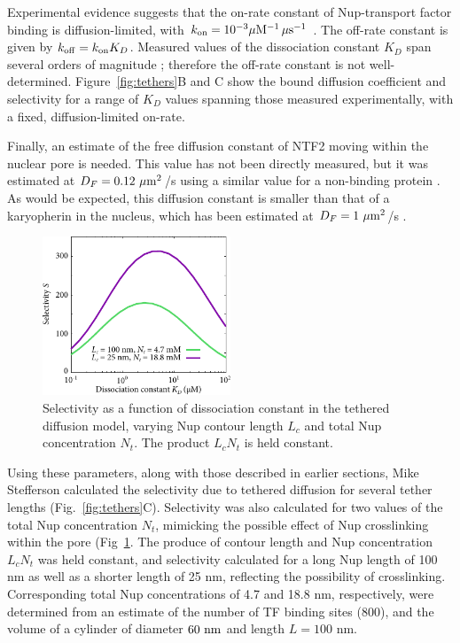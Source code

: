 Experimental evidence suggests that the on-rate constant of Nup-transport factor binding is diffusion-limited, with $k_{\rm on} = 10^{-3}\mu \mathrm{M}^{-1} \, \mu \mathrm{s}^{-1}$ \cite{milles15, hough15}.  The off-rate constant is given by $k_{\rm off} = k_{\rm on} K_D$.  Measured values of the dissociation constant $K_D$ span several orders of magnitude \cite{things}; therefore the off-rate constant is not well-determined.  Figure~\ref{fig:tethers}B and C show the bound diffusion coefficient and selectivity for a range of $K_D$ values spanning those measured experimentally, with a fixed, diffusion-limited on-rate.

Finally, an estimate of the free diffusion constant of NTF2 moving within the nuclear pore is needed.  This value has not been directly measured, but it was estimated at $D_F = 0.12 \ \mu\mathrm{m}^2$/s using a similar value for a non-binding protein \cite{ribbeck01}.  As would be expected, this diffusion constant is smaller than that of a karyopherin in the nucleus, which has been estimated at $D_F =1 \ \mu\mathrm{m}^2$/s \cite{cardarelli10}.

\begin{figure}
\centering
\includegraphics[width=0.5\textwidth]{figs/ch02/chain-comparison.pdf}
\caption{Selectivity as a function of dissociation
  constant in the tethered diffusion model, varying Nup contour length $L_c$ and total Nup concentration $N_t$.  The product $L_cN_t$ is held constant.\\}
\label{fig:chainComparison}
\end{figure}

Using these parameters, along with those described in earlier sections, Mike Stefferson calculated the selectivity due to tethered diffusion for several tether lengths (Fig.~\ref{fig:tethers}C).  Selectivity was also calculated for two values of the total Nup concentration $N_t$, mimicking the possible effect of Nup crosslinking within the pore (Fig~\ref{fig:chainComparison}.  The produce of contour length and Nup concentration $L_cN_t$ was held constant, and selectivity calculated for a long Nup length of 100 nm as well as a shorter length of 25 nm, reflecting the possibility of crosslinking.  Corresponding total Nup concentrations of 4.7 and 18.8 nm, respectively, were determined from an estimate of the number of TF binding sites ($800$), and the volume of a cylinder of diameter $60\ \nm$ and length $L = 100$ nm. 


